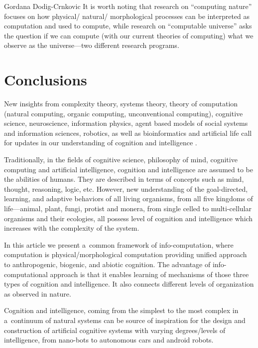 \begin{artengenv}{Gordana Dodig-Crnkovic}
It is worth noting that research on ``computing nature'' focuses on how physical/ natural/ morphological processes can be interpreted as computation and used to compute, while research on ``computable universe'' asks the question if we can compute (with our current theories of computing) what we observe as the universe---two different research programs.

\section*{Conclusions}
New insights from complexity theory, systems theory, theory of computation (natural computing, organic computing, unconventional computing), cognitive science, neuroscience, information physics, agent based models of social systems and information sciences, robotics, as well as bioinformatics and artificial life call for updates in our understanding of cognition and intelligence
\parencites{dodig-crnkovic_dialogue_2011}{dodig-crnkovic_nature_2017}.

Traditionally, in the fields of cognitive science, philosophy of mind, cognitive computing and artificial intelligence, cognition and intelligence are assumed to be the abilities of humans. They are described in terms of concepts such as mind, thought, reasoning, logic, etc. However, new understanding of the goal-directed, learning, and adaptive behaviors of all living organisms, from all five kingdoms of life---animal, plant, fungi, protist and monera, from single celled to multi-cellular organisms and their ecologies, all possess level of cognition and intelligence which increases with the complexity of the system.

In this article we present a~common framework of info-computation, where computation is physical/morphological computation providing unified approach to anthropogenic, biogenic, and abiotic cognition. The advantage of info-computational approach is that it enables learning of mechanisms of those three types of cognition and intelligence. It also connects different levels of organization as observed in nature.

Cognition and intelligence, coming from the simplest to the most complex in a~continuum of natural systems can be source of inspiration for the design and construction of artificial cognitive systems with varying degrees/levels of intelligence, from nano-bots to autonomous cars and android robots.


\end{artengenv}